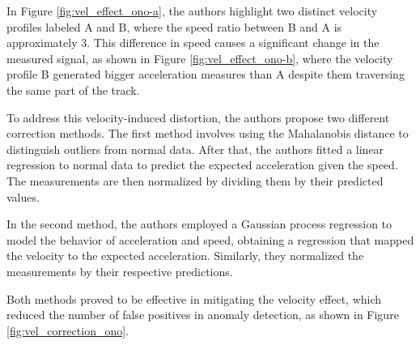 In Figure \ref{fig:vel_effect_ono-a}, the authors highlight two distinct velocity profiles labeled A and B, where the speed ratio between B and A is approximately 3. This difference in speed causes a significant change in the measured signal, as shown in Figure \ref{fig:vel_effect_ono-b}, where the velocity profile B generated bigger acceleration measures than A despite them traversing the same part of the track. 

To address this velocity-induced distortion, the authors propose two different correction methods. The first method involves using the Mahalanobis distance to distinguish outliers from normal data. After that, the authors fitted a linear regression to normal data to predict the expected acceleration given the speed. The measurements are then normalized by dividing them by their predicted values. 

In the second method, the authors employed a Gaussian process regression to model the behavior of acceleration and speed, obtaining a regression that mapped the velocity to the expected acceleration. Similarly, they normalized the measurements by their respective predictions. 

Both methods proved to be effective in mitigating the velocity effect, which reduced the number of false positives in anomaly detection, as shown in Figure \ref{fig:vel_correction_ono}.

